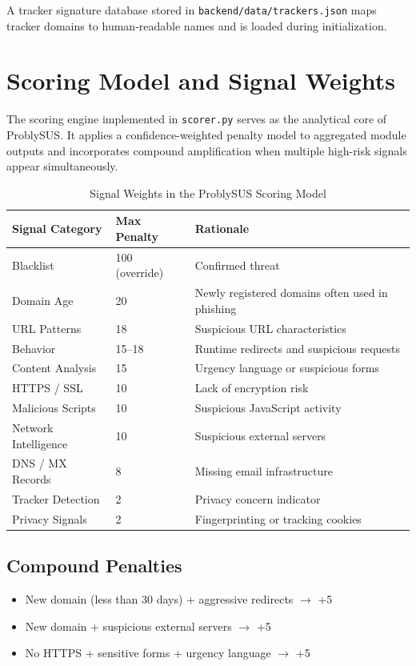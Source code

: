 A tracker signature database stored in \texttt{backend/data/trackers.json} maps tracker domains to human-readable names and is loaded during initialization.

\section{Scoring Model and Signal Weights}

The scoring engine implemented in \texttt{scorer.py} serves as the analytical core of ProblySUS. It applies a confidence-weighted penalty model to aggregated module outputs and incorporates compound amplification when multiple high-risk signals appear simultaneously.

\begin{table}[h]
\centering
\begin{tabular}{|lll|}
\toprule
Signal Category & Max Penalty & Rationale \\
\midrule
Blacklist & 100 (override) & Confirmed threat \\
Domain Age & 20 & Newly registered domains often used in phishing \\
URL Patterns & 18 & Suspicious URL characteristics \\
Behavior & 15--18 & Runtime redirects and suspicious requests \\
Content Analysis & 15 & Urgency language or suspicious forms \\
HTTPS / SSL & 10 & Lack of encryption risk \\
Malicious Scripts & 10 & Suspicious JavaScript activity \\
Network Intelligence & 10 & Suspicious external servers \\
DNS / MX Records & 8 & Missing email infrastructure \\
Tracker Detection & 2 & Privacy concern indicator \\
Privacy Signals & 2 & Fingerprinting or tracking cookies \\
\bottomrule
\end{tabular}
\caption{Signal Weights in the ProblySUS Scoring Model}
\end{table}

\subsection{Compound Penalties}

\begin{itemize}
\item New domain (less than 30 days) + aggressive redirects $\rightarrow$ +5
\item New domain + suspicious external servers $\rightarrow$ +5
\item No HTTPS + sensitive forms + urgency language $\rightarrow$ +5
\end{itemize}

